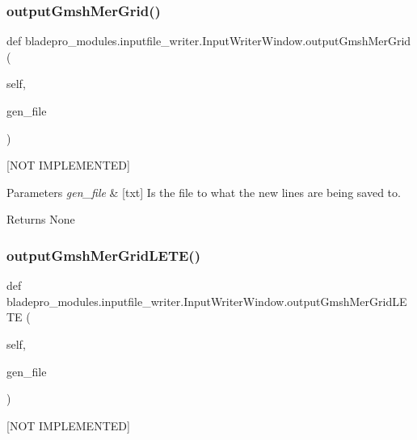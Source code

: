 \subsubsection{\texorpdfstring{output\+Gmsh\+Mer\+Grid()}{outputGmshMerGrid()}}
{\footnotesize\ttfamily def bladepro\+\_\+modules.\+inputfile\+\_\+writer.\+Input\+Writer\+Window.\+output\+Gmsh\+Mer\+Grid (\begin{DoxyParamCaption}\item[{}]{self,  }\item[{}]{gen\+\_\+file }\end{DoxyParamCaption})}



\mbox{[}N\+OT I\+M\+P\+L\+E\+M\+E\+N\+T\+ED\mbox{]} 


\begin{DoxyParams}{Parameters}
{\em gen\+\_\+file} & \mbox{[}txt\mbox{]} Is the file to what the new lines are being saved to. \\
\hline
\end{DoxyParams}
\begin{DoxyReturn}{Returns}
None 
\end{DoxyReturn}
\hypertarget{a00073_a36211b3ff2243e25921e48d71b9dcf7c}{}\label{a00073_a36211b3ff2243e25921e48d71b9dcf7c} 
\subsubsection{\texorpdfstring{output\+Gmsh\+Mer\+Grid\+L\+E\+T\+E()}{outputGmshMerGridLETE()}}
{\footnotesize\ttfamily def bladepro\+\_\+modules.\+inputfile\+\_\+writer.\+Input\+Writer\+Window.\+output\+Gmsh\+Mer\+Grid\+L\+E\+TE (\begin{DoxyParamCaption}\item[{}]{self,  }\item[{}]{gen\+\_\+file }\end{DoxyParamCaption})}



\mbox{[}N\+OT I\+M\+P\+L\+E\+M\+E\+N\+T\+ED\mbox{]} 


